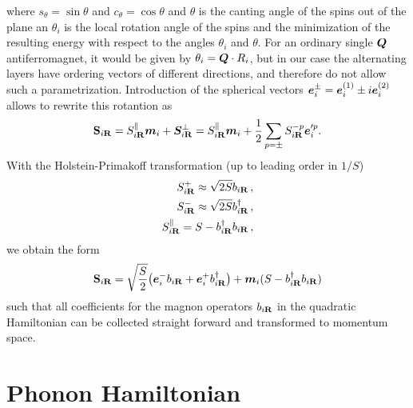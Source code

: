 \documentclass[aps,prl,twocolumn,superscriptaddress,amsmath,amssymb,floats,aps,10pt]{revtex4-1}
\begin{document}
where $s_\theta=\sin\theta$ and $c_\theta=\cos\theta$ and $\theta$ is the canting angle of the spins out of the plane an $\theta_i$ is the local rotation angle of the spins
and the minimization of the resulting energy with respect to the angles $\theta_i$ and $\theta$.
For an ordinary single $\bm Q$ antiferromagnet, it would be given by $\theta_i=\bm Q\cdot R_i$, but in our case the alternating layers
have ordering vectors of different directions, and therefore do not allow such a parametrization.
Introduction of the
spherical vectors $\bm e_i^{\pm}=\bm e_i^{ (1)}\pm i\bm e_i^{(2)}$
allows to rewrite this rotantion as
 \begin{equation}
  {\bf S}_{i\bf R}=S_{i\bf R}^\parallel \bm m_i  +\bm S_{i\bf R}^\perp=S_{i\bf R}^\parallel \bm m_i+\frac 12 \sum_{p=\pm}S_{i\bf R}^{-p} \bm e_i^{\prime p}.
 \end{equation}
With the Holstein-Primakoff transformation (up to leading order in $1/S$)
\begin{subequations}
  \begin{align}
S_{i\bf R}^+\approx\sqrt{2S}b_{i\bf R}\,,\notag\\
S_{i\bf R}^-\approx\sqrt{2S} b_{i\bf R}^\dagger\,,\notag\\
S_{i\bf R}^\parallel=S-b_{i\bf R}^\dagger b_{i\bf R}\,,\label{eq_HP}
  \end{align}
  \end{subequations}
we obtain the form
\begin{equation}
 {\bf S}_{i\bf R}=\sqrt{\frac S2}\bigl(\bm e_i^{-} b_{i\bf R}+\bm e_i^+b_{i\bf R}^\dagger\bigr)+\bm m_i (S-b_{i\bf R}^\dagger b_{i\bf R})\label{eq_hp_rotation}
\end{equation}
such that all coefficients for the magnon operators $b_{i\bf R}$ in the quadratic Hamiltonian can be collected straight forward\cite{Toth15} and transformed to momentum space.


\section{Phonon Hamiltonian}
\end{document}
